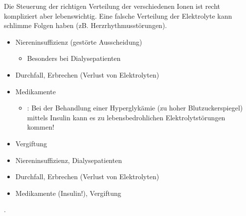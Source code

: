 \documentclass[
ngerman,
paper=a4,
asymmetric,
fontsize=10pt,
draft=false,
numbers=noenddot,
bibtotocnumbered,
footnotes=multiple,
]{scrreprt}
\newcommand{\jALTende}{\newline{\color{red}\rule{\linewidth}{2pt}\newline}}
\begin{document}
Die Steuerung der richtigen Verteilung der verschiedenen
Ionen ist recht kompliziert aber lebenswichtig. Eine
falsche Verteilung der Elektrolyte kann schlimme Folgen
haben (zB. Herzrhythmusstörungen).
 
 
 {%
 \label{topic:elektrolytstoerungen}
 \label{topic:dialyse-elektrolyte}
 \begin{itemize}
     \item Niereninsuffizienz (gestörte Ausscheidung)
     \begin{itemize}
         \item Besonders bei
         Dialysepatienten
     \end{itemize}
     \item Durchfall, Erbrechen (Verlust von Elektrolyten)
     \item Medikamente
     \begin{itemize}
       \item {}: Bei
       der Behandlung einer Hyperglykämie (zu hoher Blutzuckerspiegel) 
       mittels Insulin kann es
       zu lebensbedrohlichen Elektrolytstörungen kommen!
     \end{itemize}
     \item Vergiftung
 \end{itemize}
 }{%
 \begin{itemize}
     \item Niereninsuffizienz, Dialysepatienten
     \item Durchfall, Erbrechen (Verlust von Elektrolyten)
     \item Medikamente (Insulin!), Vergiftung
 \end{itemize}
 }{}{}{}
.
 \jALTende
 
\end{document}
